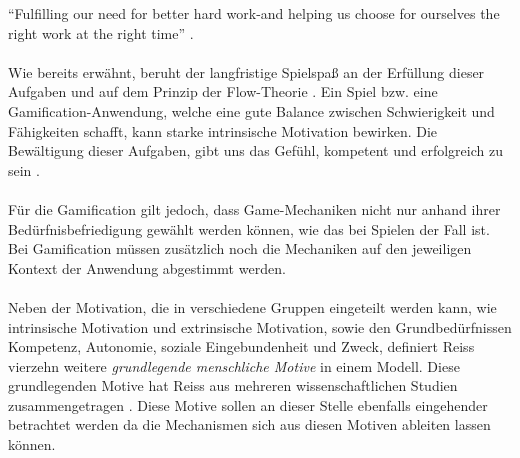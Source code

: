 \documentclass[a4paper,12pt]{scrartcl}
\begin{document}
\enquote{Fulfilling our need for better hard work-and helping us choose for ourselves the right work at the right time} \cite{Mcgonigal2011}. 
\\\\
Wie bereits erwähnt, beruht der langfristige Spielspaß an der Erfüllung dieser Aufgaben und auf dem Prinzip der Flow-Theorie \cite{Csikszentmihalyi2017}. Ein Spiel bzw. eine Gamification-Anwendung, welche eine gute Balance zwischen Schwierigkeit und Fähigkeiten schafft, kann starke intrinsische Motivation bewirken. Die Bewältigung dieser Aufgaben, gibt uns das Gefühl, kompetent und erfolgreich zu sein \cite{Mcgonigal2011}\cite{Mayer2009}.
\\\\
Für die Gamification gilt jedoch, dass Game-Mechaniken nicht nur anhand ihrer Bedürfnisbefriedigung gewählt werden können, wie das bei Spielen der Fall ist. Bei Gamification müssen zusätzlich noch die Mechaniken auf den jeweiligen Kontext der Anwendung abgestimmt werden.  
\\\\
Neben der Motivation, die in verschiedene Gruppen eingeteilt werden kann, wie intrinsische Motivation und extrinsische Motivation, sowie den Grundbedürfnissen Kompetenz, Autonomie, soziale Eingebundenheit und Zweck, definiert Reiss vierzehn weitere \textit{grundlegende menschliche Motive} in einem Modell. Diese grundlegenden Motive hat Reiss aus mehreren wissenschaftlichen Studien zusammengetragen \cite{Reiss2009}. Diese Motive sollen an dieser Stelle ebenfalls eingehender betrachtet werden da die Mechanismen sich aus diesen Motiven ableiten lassen können.
\end{document}

